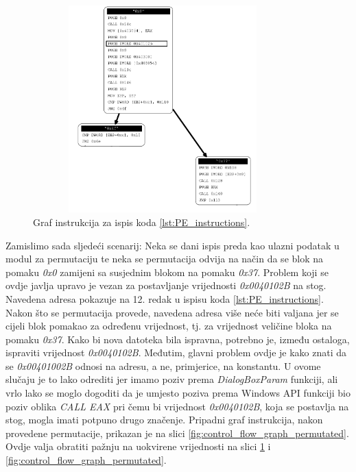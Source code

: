 \documentclass[times, utf8, diplomski, numeric]{fer}
\begin{document}
\begin{figure}[!htb]
\centering
\setlength\fboxsep{0pt}
\setlength\fboxrule{0.5pt}
\includegraphics[width=10cm, height=8cm]{slike/permutator_graph_part}
\caption{Graf instrukcija za ispis koda \ref{lst:PE_instructions}.}
\label{fig:control_flow_graph_pe} 
\end{figure}

Zamislimo sada sljedeći scenarij: Neka se dani ispis
preda kao ulazni podatak u modul za permutaciju te neka se
permutacija odvija na način da se blok na pomaku \emph{0x0}
zamijeni sa susjednim blokom na pomaku \emph{0x37}. 
Problem koji se ovdje javlja upravo je vezan za
postavljanje vrijednosti \emph{0x0040102B} na stog. Navedena
adresa pokazuje na 12. redak u ispisu koda 
\ref{lst:PE_instructions}. Nakon što se permutacija provede,
navedena adresa više neće biti valjana jer se cijeli blok pomakao
za određenu vrijednost, tj. za vrijednost veličine bloka na
pomaku \emph{0x37}. Kako bi nova datoteka bila ispravna,
potrebno je, između ostaloga, ispraviti vrijednost
\emph{0x0040102B}. Međutim, glavni problem ovdje je kako znati da
se \emph{0x00401002B} odnosi na adresu, a ne, primjerice, na
konstantu. U ovome slučaju je to lako odrediti jer imamo poziv
prema \emph{DialogBoxParam} funkciji, ali vrlo lako se moglo
dogoditi da je umjesto poziva prema Windows API funkciji bio
poziv oblika \emph{CALL EAX} pri čemu bi vrijednost
\emph{0x0040102B}, koja se postavlja na stog, mogla imati potpuno drugo
značenje.  Pripadni graf instrukcija, nakon provedene
permutacije, prikazan je na slici 
\ref{fig:control_flow_graph_permutated}. Ovdje valja obratiti
pažnju na uokvirene vrijednosti na slici 
\ref{fig:control_flow_graph_pe} i \ref{fig:control_flow_graph_permutated}.
\end{document}
